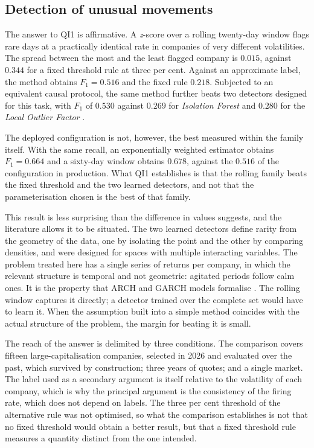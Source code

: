 \subsection{Detection of unusual movements}

The answer to \gls{QI}1 is affirmative. A \emph{z}-score over a rolling twenty-day window flags
rare days at a practically identical rate in companies of very different volatilities. The spread
between the most and the least flagged company is $0.015$, against $0.344$ for a fixed threshold
rule at three per cent. Against an approximate label, the method obtains $F_1 = 0.516$ and the
fixed rule $0.218$. Subjected to an equivalent causal protocol, the same method further beats two
detectors designed for this task, with $F_1$ of $0.530$ against $0.269$ for \emph{Isolation Forest}
\autocite{liu2008isolation} and $0.280$ for the \emph{Local Outlier Factor}
\autocite{breunig2000lof}.

The deployed configuration is not, however, the best measured within the family itself. With the
same recall, an exponentially weighted estimator obtains $F_1 = 0.664$ and a sixty-day window
obtains $0.678$, against the $0.516$ of the configuration in production. What \gls{QI}1 establishes
is that the rolling family beats the fixed threshold and the two learned detectors, and not that
the parameterisation chosen is the best of that family.

This result is less surprising than the difference in values suggests, and the literature allows
it to be situated. The two learned detectors define rarity from the geometry of the data, one by
isolating the point and the other by comparing densities, and were designed for spaces with
multiple interacting variables. The problem treated here has a single series of returns per
company, in which the relevant structure is temporal and not geometric: agitated periods follow
calm ones. It is the property that \gls{ARCH} and \gls{GARCH} models formalise
\autocite{engle1982arch, bollerslev1986garch}. The rolling window captures it directly; a detector
trained over the complete set would have to learn it. When the assumption built into a simple
method coincides with the actual structure of the problem, the margin for beating it is small.

The reach of the answer is delimited by three conditions. The comparison covers fifteen
large-capitalisation companies, selected in 2026 and evaluated over the past, which survived by
construction; three years of quotes; and a single market. The label used as a secondary argument is
itself relative to the volatility of each company, which is why the principal argument is the
consistency of the firing rate, which does not depend on labels. The three per cent threshold of
the alternative rule was not optimised, so what the comparison establishes is not that no fixed
threshold would obtain a better result, but that a fixed threshold rule measures a quantity
distinct from the one intended.

